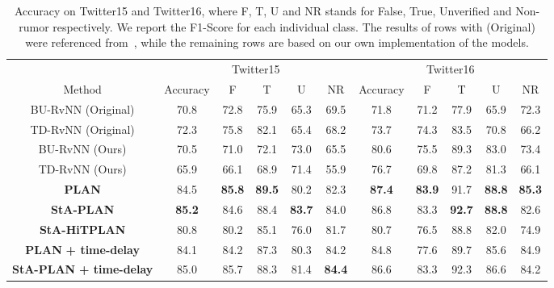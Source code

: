 \documentclass[letterpaper]{article} %
\begin{document}
\begin{table}[ht]
\small
\centering
\begin{tabular}{ccccccccccc} \toprule
& \multicolumn{5}{c}{Twitter15} & \multicolumn{5}{c}{Twitter16} \\
Method		&	Accuracy & F & T & U & NR & Accuracy & F & T & U & NR \\ \midrule
BU-RvNN	(Original) & 70.8 & 72.8 & 75.9 & 65.3 & 69.5
& 71.8 & 71.2 & 77.9 & 65.9 & 72.3\\
TD-RvNN (Original) & 72.3 & 75.8 & 82.1 & 65.4 & 68.2
& 73.7 & 74.3 & 83.5 & 70.8 & 66.2 \\
BU-RvNN (Ours)	& 70.5 & 71.0 & 72.1 & 73.0 & 65.5
& 80.6 & 75.5 & 89.3 & 83.0 & 73.4\\
TD-RvNN	(Ours) & 65.9 & 66.1 & 68.9 & 71.4 & 55.9
& 76.7 & 69.8 & 87.2 & 81.3 & 66.1 \\
\midrule
\textbf{PLAN}	& 84.5 & \textbf{85.8} & \textbf{89.5} & 80.2 & 82.3
 & \textbf{87.4} & \textbf{83.9} & 91.7 & \textbf{88.8} & \textbf{85.3} \\
\textbf{StA-PLAN} & \textbf{85.2} & 84.6 & 88.4 & \textbf{83.7} & 84.0
& 86.8 & 83.3 & \textbf{92.7} & \textbf{88.8} & 82.6\\
\textbf{StA-HiTPLAN} & 80.8 & 80.2 & 85.1 & 76.0 & 81.7
& 80.7 & 76.5 & 88.8 & 82.0 & 74.9 \\
\textbf{PLAN} \textbf{+ time-delay}	& 84.1 & 84.2 & 87.3 & 80.3 & 84.2
& 84.8 & 77.6 & 89.7 & 85.6 & 84.9\\
\textbf{StA-PLAN} \textbf{+ time-delay} & 85.0 & 85.7 & 88.3 & 81.4 & \textbf{84.4}
 & 86.6 & 83.3 & 92.3 & 86.6 & 84.2 \\
\bottomrule
\end{tabular}
\caption{Accuracy on Twitter15 and Twitter16, where F, T, U and NR stands for False, True, Unverified and Non-rumor respectively. We report the F1-Score for each individual class. The results of rows with (Original) were referenced from~\cite{ma17}, while the remaining rows are based on our own implementation of the models.}
\label{tab:results_15}
\end{table}
\end{document}
